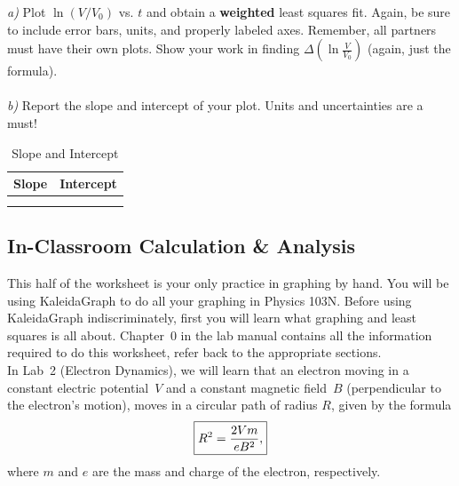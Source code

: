 {\it a)} Plot $\ln (V / V_0)$ vs. $t$ and obtain a {\bf weighted} least
squares fit. Again, be sure to include error bars, units, and properly
labeled axes.  Remember, all partners must have their own plots.  
Show your work in finding $\Delta( \ln \frac{V}{V_0})$ (again, just the formula). \\
\vspace*{3cm} \\

{\it b)} Report the slope and intercept of your plot.
Units and uncertainties are a must! \\
\begin{table}[htb]
\begin{center}
\begin{tabular}{|c|c|}
\hline
Slope & Intercept \\
\hline
\hspace*{5cm} & \hspace*{5cm} \\
& \\
\hline
\end{tabular}
\end{center}
\caption{Slope and Intercept }
\end{table}

\subsection{In-Classroom Calculation \& Analysis}

\noindent This half of the worksheet is your only
practice in graphing by hand.  You will be using KaleidaGraph
to do all your graphing in Physics 103N.  Before using KaleidaGraph 
indiscriminately, first you will learn what graphing and least squares 
is all about.  Chapter~0 in the lab manual contains all the information
required to do this worksheet, refer back to the appropriate sections. \\

\noindent In Lab~2 (Electron Dynamics), we will learn that an electron 
moving in a 
constant electric potential~$V$ and a constant magnetic field~$B$ 
(perpendicular to the electron's motion), moves in a circular path of radius 
$R$, given by the formula
\begin{equation}
\fbox{$ \displaystyle R^2=\frac{2Vm}{eB^2}, $} \label{eq:1st:elect}
\end{equation}
where $m$ and $e$ are the mass and charge of the electron, respectively.\\

